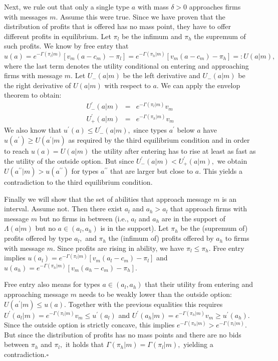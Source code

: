 \documentclass[12pt]{article}
\begin{document}
Next, we rule out that only a single type $a$ with mass $\delta >0$
approaches firms with messages $m$. Assume this were true. Since we have
proven that the distribution of profits that is offered has no mass point,
they have to offer different profits in equilibrium. Let $\pi _{l}$ be the
infimum and $\pi _{h}$ the supremum of such profits. We know by free entry
that $u(a)=e^{-\Gamma (\pi _{l}|m)}\left[ v_{m}(a-c_{m})-\pi _{l}\right]
=e^{-\Gamma (\pi _{h}|m)}\left[ v_{m}(a-c_{m})-\pi _{h}\right] =:U(a|m),$
where the last term denotes the utility conditional on entering and
approaching firms with message $m.$ Let $U_{-}(a|m)$ be the left derivative
and $U_{-}(a|m)$ be the right derivative of $U(a|m)$ with respect to $a.$ We
can apply the envelop theorem to obtain:%
\begin{eqnarray*}
U_{-}^{\prime }(a|m) &=&e^{-\Gamma (\pi _{l}|m)}v_{m} \\
U_{+}^{\prime }(a|m) &=&e^{-\Gamma (\pi _{h}|m)}v_{m}
\end{eqnarray*}%
We also know that $u^{\prime }(a)\leq U_{-}^{\prime }(a|m),$ since types $%
a^{\prime }$ below $a$ have $u(a^{\prime })\geq U(a^{\prime }|m)$ as
required by the third equilibrium condition and in order to reach $%
u(a)=U(a|m)$ the utility after entering has to rise at least as fast as the
utility of the outside option. But since $U_{-}^{\prime }(a|m)<U_{+}^{\prime
}(a|m),$ we obtain $U(a^{\prime \prime }|m)>u(a^{\prime \prime })$ for types 
$a^{\prime \prime }$ that are larger but close to $a.$ This yields a
contradiction to the third equilibrium condition.

Finally we will show that the set of abilities that approach message $m$ is
an interval. Assume not. Then there exist $a_{l}$ and $a_{h}>a_{l}$ that
approach firms with message $m$ but no firms in between (i.e., $a_{l}$ and $%
a_{h}$ are in the support of $\Lambda (a|m)$ but no $a\in (a_{l},a_{h})$ is
in the support). Let $\pi _{h}$ be the (supremum of) profits offered by type 
$a_{l},$ and $\pi _{h}$ the (infimum of) profits offered by $a_{h}$ to firms
with message $m.$ Since profits are rising in ability, we have $\pi _{l}\leq
\pi _{h}.$ Free entry implies $u(a_{l})=e^{-\Gamma (\pi _{l}|m)}\left[
v_{m}(a_{l}-c_{m})-\pi _{l}\right] $ and $u(a_{h})=e^{-\Gamma (\pi _{h}|m)}%
\left[ v_{m}(a_{h}-c_{m})-\pi _{h}\right] .$

Free entry also means for types $a\in (a_{l},a_{h})$ that their utility from
entering and approaching message $m$ needs to be weakly lower than the
outside option: $U(a^{\prime }|m)\leq u(a).$ Together with the previous
equalities this requires $U^{\prime }(a_{l}|m)=e^{-\Gamma (\pi
_{l}|m)}v_{m}\leq u^{\prime }(a_{l})$ and $U^{\prime }(a_{h}|m)=e^{-\Gamma
(\pi _{h}|m)}v_{m}\geq u^{\prime }(a_{h}).$ Since the outside option is
strictly concave, this implies $e^{-\Gamma (\pi _{h}|m)}>e^{-\Gamma (\pi
_{l}|m)}.$ But since the distribution of profits has no mass points and
there are no bids between $\pi _{h}$ and $\pi _{l},$ it holds that $\Gamma
(\pi _{h}|m)=\Gamma (\pi _{l}|m),$ yielding a contradiction.$\square $
\end{document}
